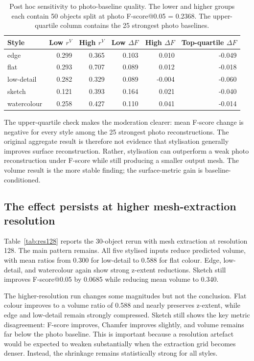 \documentclass[12pt,a4paper]{article}
\begin{document}
\begin{table}[!ht]
\caption{Post hoc sensitivity to photo-baseline quality. The lower and higher groups each contain 50 objects split at photo F-score@0.05 = 0.2368. The upper-quartile column contains the 25 strongest photo baselines.}
\label{tab:baseline}
\centering
\begin{tabular}{lrrrrr}
\toprule
Style & Low $r^V$ & High $r^V$ & Low $\Delta F$ & High $\Delta F$ & Top-quartile $\Delta F$ \\
\midrule
edge & 0.299 & 0.365 & 0.103 & 0.010 & -0.049 \\
flat & 0.293 & 0.707 & 0.089 & 0.012 & -0.018 \\
low-detail & 0.282 & 0.329 & 0.089 & -0.004 & -0.060 \\
sketch & 0.121 & 0.393 & 0.164 & 0.021 & -0.040 \\
watercolour & 0.258 & 0.427 & 0.110 & 0.041 & -0.014 \\
\bottomrule
\end{tabular}
\end{table}

The upper-quartile check makes the moderation clearer: mean F-score change is negative for every style among the 25 strongest photo reconstructions. The original aggregate result is therefore not evidence that stylisation generally improves surface reconstruction. Rather, stylisation can outperform a weak photo reconstruction under F-score while still producing a smaller output mesh. The volume result is the more stable finding; the surface-metric gain is baseline-conditioned.

\subsection{The effect persists at higher mesh-extraction resolution}

Table~\ref{tab:res128} reports the 30-object rerun with mesh extraction at resolution 128. The main pattern remains. All five stylised inputs reduce predicted volume, with mean ratios from 0.300 for low-detail to 0.588 for flat colour. Edge, low-detail, and watercolour again show strong z-extent reductions. Sketch still improves F-score@0.05 by 0.0685 while reducing mean volume to 0.340.

The higher-resolution run changes some magnitudes but not the conclusion. Flat colour improves to a volume ratio of 0.588 and nearly preserves z-extent, while edge and low-detail remain strongly compressed. Sketch still shows the key metric disagreement: F-score improves, Chamfer improves slightly, and volume remains far below the photo baseline. This is important because a resolution artefact would be expected to weaken substantially when the extraction grid becomes denser. Instead, the shrinkage remains statistically strong for all styles.
\end{document}
